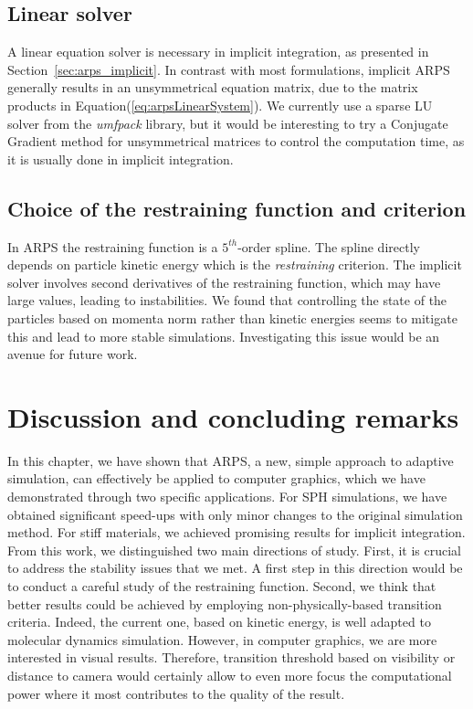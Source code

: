 \subsection{Linear solver}
A linear equation solver is necessary in implicit integration, as presented in Section~\ref{sec:arps_implicit}.
In contrast with most formulations, implicit ARPS generally results in an unsymmetrical equation matrix, due to the matrix products in Equation(\ref{eq:arpsLinearSystem}).
We currently use a sparse LU solver from the \emph{umfpack} library, but it would be interesting to try a Conjugate Gradient method for unsymmetrical matrices to control the computation time, as it is usually done in implicit integration.

\subsection{Choice of the restraining function and criterion}
In ARPS the restraining function is a $5^{th}$-order spline.
The spline directly depends on particle kinetic energy which is the \emph{restraining} criterion.
The implicit solver involves second derivatives of the restraining function, which may have large values, leading to instabilities.
We found that controlling the state of the particles based on momenta norm rather than kinetic energies seems to mitigate this and lead to more stable simulations.
Investigating this issue would be an avenue for future work.

\section{Discussion and concluding remarks} 
\label{sec:arps_discussion}
In this chapter, we have shown that ARPS, a new, simple approach to adaptive simulation, can effectively be applied to computer graphics, which we have demonstrated through two specific applications.
For SPH simulations, we have obtained significant speed-ups with only minor changes to the original simulation method.
For stiff materials, we achieved promising results for implicit integration.
From this work, we distinguished two main directions of study.
First, it is crucial to address the stability issues that we met. 
A first step in this direction would be to conduct a careful study of the restraining function.
Second, we think that better results could be achieved by employing non-physically-based transition criteria. 
Indeed, the current one, based on kinetic energy, is well adapted to molecular dynamics simulation. 
However, in computer graphics, we are more interested in visual results.
Therefore, transition threshold based on visibility or distance to camera would certainly allow to even more focus the computational power where it most contributes to the quality of the result.

